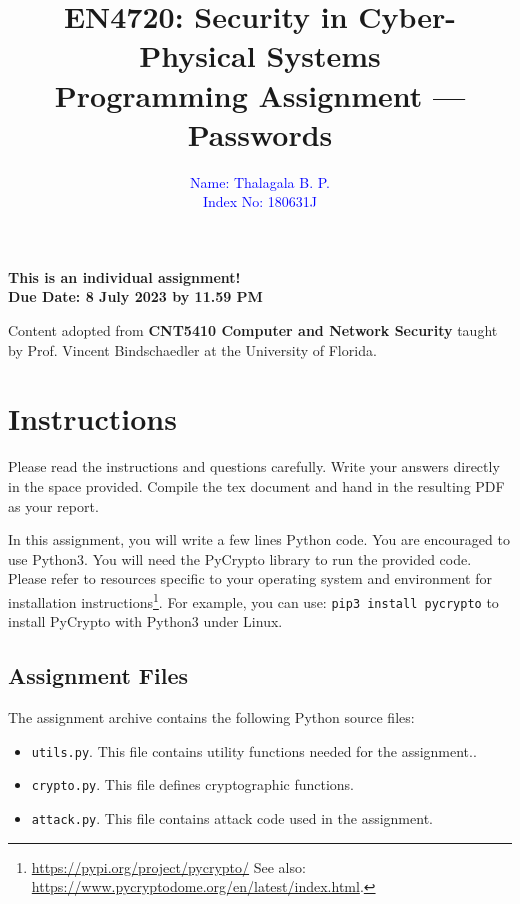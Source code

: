 \documentclass[11pt,letterpaper]{article}
\begin{document}
	
	\title{EN4720: Security in Cyber-Physical Systems \\ Programming Assignment --- Passwords}
	
	\author{ \textcolor{blue}{Name: Thalagala B. P.} \\ \textcolor{blue}{Index No: 180631J}}
	
	\maketitle
	
	\begin{center}
		\color{red}\bf This is an individual assignment! \\ Due Date: 8 July 2023 by 11.59 PM
	\end{center}
	
	\begin{center}
		\small Content adopted from {\bf CNT5410 Computer and Network Security} taught by Prof. Vincent Bindschaedler at the University of Florida.
	\end{center}
	
	\section*{Instructions}
	
	Please read the instructions and questions carefully. Write your answers directly in the space provided. Compile the tex document and hand in the resulting PDF as your report.
	
	In this assignment, you will write a few lines Python code. You are encouraged to use Python3. You will need the PyCrypto library to run the provided code. Please refer to resources specific to your operating system and environment for installation instructions\footnote{\url{https://pypi.org/project/pycrypto/} See also:  \url{https://www.pycryptodome.org/en/latest/index.html}.}. For example, you can use: \texttt{pip3 install pycrypto} to install PyCrypto with Python3 under Linux.
	
	\subsection*{Assignment Files}
	The assignment archive contains the following Python source files:
	\begin{itemize}[nolistsep]
		\item \texttt{utils.py}. This file contains utility functions needed for the assignment..
		\item \texttt{crypto.py}. This file defines cryptographic functions. 
		\item \texttt{attack.py}. This file contains attack code used in the assignment.
	\end{itemize}
	
\end{document}
